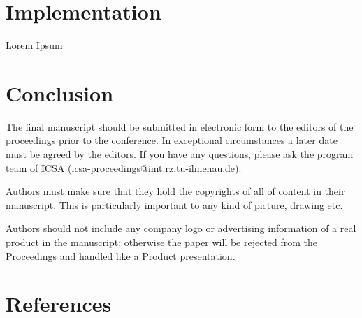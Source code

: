 \documentclass[a4paper, 10pt, twocolumn]{article}
\begin{document}
\section{Implementation} \label{sec:Implementation}

Lorem Ipsum


\section{Conclusion }
The final manuscript should be submitted in electronic form to the editors of the proceedings prior to the conference. In exceptional circumstances a later date must be agreed by the editors. If you have any questions, please ask the program team of ICSA (icsa-proceedings@imt.rz.tu-ilmenau.de).

Authors must make sure that they hold the copyrights of all of content in their manuscript. This is particularly important to any kind of picture, drawing etc.

Authors should not include any company logo or advertising information of a real product in the manuscript; otherwise the paper will be rejected from the Proceedings and handled like a Product presentation. 

\renewcommand\refname{}
\section{References}

\begingroup
\RaggedRight 		%

\printbibliography
\endgroup
\end{document}
